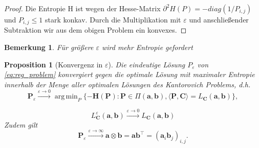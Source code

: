\documentclass[11pt,a4paper]{article}
\DeclareMathOperator*{\argmin}{arg\,min}
\newtheorem{proposition}[theorem]{Proposition}
\newtheorem{remark}[theorem]{Bemerkung}
\numberwithin{equation}{section}
\begin{document}
	\begin{proof}
		Die Entropie H ist wegen der Hesse-Matrix $\partial ^2 H (P) = -diag(1/P_{i,j})$ und $P_{i,j} \leq 1$ stark konkav.
		Durch die Multiplikation mit $\varepsilon$ und anschließender Subtraktion wir aus dem obigen Problem ein konvexes. 
	\end{proof}
	
	\begin{remark}
		Für größere $\varepsilon$ wird mehr Entropie gefordert
	\end{remark}
	
	\begin{proposition}[Konvergenz in $\varepsilon$]
		Die eindeutige Lösung $P_\varepsilon$ von \autoref{eq:reg_problem} konvergiert gegen die optimale Lösung mit maximaler Entropie innerhalb der Menge aller optimalen Lösungen des Kantorovich Problems, d.h.
		\begin{equation}
		\boldsymbol{P}_\varepsilon \xrightarrow{\varepsilon \to 0} \argmin_{P} \lbrace -\boldsymbol{H}(\boldsymbol{P}) : \boldsymbol{P} \in \Pi (\boldsymbol{a}, \boldsymbol{b}), \langle \boldsymbol{P}, \boldsymbol{C} \rangle = L_{\boldsymbol{C}}(\boldsymbol{a}, \boldsymbol{b}) \rbrace, \label{eq:P_eps_0} 
		\end{equation}
		
	
		\begin{equation}
		L_{\boldsymbol{C}}^\varepsilon (\boldsymbol{a}, \boldsymbol{b}) \xrightarrow{\varepsilon \to 0} L_{\boldsymbol{C}}(\boldsymbol{a}, \boldsymbol{b})
		\end{equation}
		Zudem gilt
		\begin{equation}
		\boldsymbol{P}_\varepsilon \xrightarrow{\varepsilon \to \infty} \boldsymbol{a} \otimes \boldsymbol{b} = \boldsymbol{a} \boldsymbol{b}^\top = (\boldsymbol{a}_i \boldsymbol{b}_j)_{i,j}. \label{eq:P_eps_infty}
		\end{equation}
	\end{proposition}
	
\end{document}
